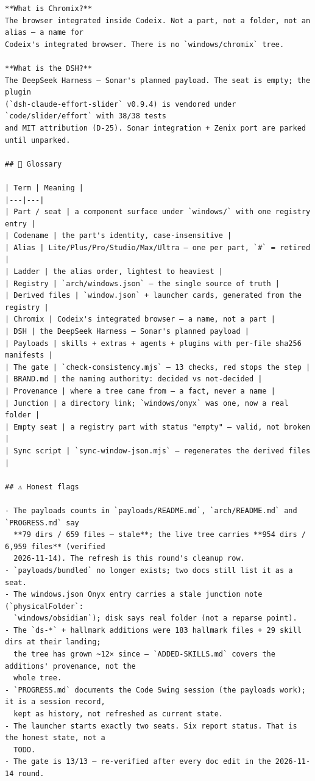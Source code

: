 \begin{Verbatim}[breaklines,breakanywhere,fontsize=\footnotesize]
**What is Chromix?**
The browser integrated inside Codeix. Not a part, not a folder, not an alias — a name for
Codeix's integrated browser. There is no `windows/chromix` tree.

**What is the DSH?**
The DeepSeek Harness — Sonar's planned payload. The seat is empty; the plugin
(`dsh-claude-effort-slider` v0.9.4) is vendored under `code/slider/effort` with 38/38 tests
and MIT attribution (D-25). Sonar integration + Zenix port are parked until unparked.

## 📖 Glossary

| Term | Meaning |
|---|---|
| Part / seat | a component surface under `windows/` with one registry entry |
| Codename | the part's identity, case-insensitive |
| Alias | Lite/Plus/Pro/Studio/Max/Ultra — one per part, `#` = retired |
| Ladder | the alias order, lightest to heaviest |
| Registry | `arch/windows.json` — the single source of truth |
| Derived files | `window.json` + launcher cards, generated from the registry |
| Chromix | Codeix's integrated browser — a name, not a part |
| DSH | the DeepSeek Harness — Sonar's planned payload |
| Payloads | skills + extras + agents + plugins with per-file sha256 manifests |
| The gate | `check-consistency.mjs` — 13 checks, red stops the step |
| BRAND.md | the naming authority: decided vs not-decided |
| Provenance | where a tree came from — a fact, never a name |
| Junction | a directory link; `windows/onyx` was one, now a real folder |
| Empty seat | a registry part with status "empty" — valid, not broken |
| Sync script | `sync-window-json.mjs` — regenerates the derived files |

## ⚠️ Honest flags

- The payloads counts in `payloads/README.md`, `arch/README.md` and `PROGRESS.md` say
  **79 dirs / 659 files — stale**; the live tree carries **954 dirs / 6,959 files** (verified
  2026-11-14). The refresh is this round's cleanup row.
- `payloads/bundled` no longer exists; two docs still list it as a seat.
- The windows.json Onyx entry carries a stale junction note (`physicalFolder`:
  `windows/obsidian`); disk says real folder (not a reparse point).
- The `ds-*` + hallmark additions were 183 hallmark files + 29 skill dirs at their landing;
  the tree has grown ~12× since — `ADDED-SKILLS.md` covers the additions' provenance, not the
  whole tree.
- `PROGRESS.md` documents the Code Swing session (the payloads work); it is a session record,
  kept as history, not refreshed as current state.
- The launcher starts exactly two seats. Six report status. That is the honest state, not a
  TODO.
- The gate is 13/13 — re-verified after every doc edit in the 2026-11-14 round.


\end{Verbatim}
